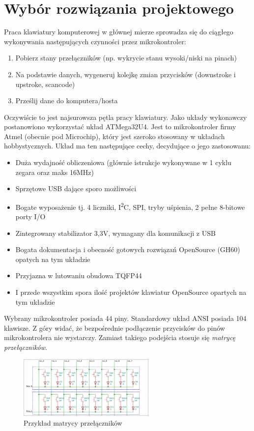 \documentclass{article}
\begin{document}
    \section{Wybór rozwiązania projektowego}
    Praca klawiatury komputerowej w głównej mierze sprowadza się do ciągłego wykonywania następujących
    czynności przez mikrokontroler:
    \begin{enumerate}
        \item Pobierz stany przełączników (np. wykrycie stanu wysoki/niski na pinach)
        \item Na podstawie danych, wygeneruj kolejkę zmian przycisków (downstroke i upstroke, scancode)
        \item Prześlij dane do komputera/hosta
    \end{enumerate}
    Oczywiście to jest najsurowsza pętla pracy klawiatury. Jako układy wykonawczy postanowiono wykorzystać
    układ ATMega32U4. Jest to mikrokontroler firmy Atmel (obecnie pod Microchip), który jest szeroko stosowany
    w układach hobbystycznych. Układ ma ten następujące cechy, decydujące o jego zastosowanu:
    \begin{itemize}
        \item Duża wydajność obliczeniowa (głównie istrukcje wykonywane w 1 cyklu zegara oraz maks 16MHz)
        \item Sprzętowe USB dające sporo możliwości
        \item Bogate wyposażenie tj. 4 liczniki,  I\textsuperscript{2}C, SPI, tryby uśpienia, 2 pełne 8-bitowe porty I/O
        \item Zintegrowany stabilizator 3,3V, wymagany dla komunikacji z USB
        \item Bogata dokumentacja i obecność gotowych rozwiązań OpenSource (GH60) opatych na tym układzie
        \item Przyjazna w lutowaniu obudowa TQFP44
        \item I przede wszystkim spora ilość projektów klawiatur OpenSource opartych na tym układzie
    \end{itemize}
    Wybrany mikrokontroler posiada 44 piny. Standardowy układ ANSI posiada 104 klawisze. Z góry widać, że bezpośrednie
    podłączenie przycisków do pinów mikrokontrolera nie wystarczy. Zamiast takiego podejścia stosuje się \emph{matrycę przełączników}.
    \newpage
    \begin{figure}[h]
        \centering
        \includegraphics[width=0.6\textwidth]{1}
        \caption{Przykład matrycy przełączników}
    \end{figure}
\end{document}

